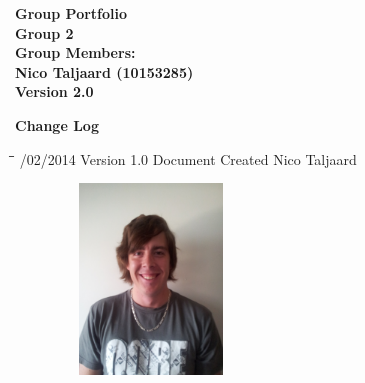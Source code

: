 \documentclass[12pt]{article}
\newcommand{\Title}{Group Portfolio} %
\begin{document}
	\begin{center}%
	
	  \LARGE \bf \Title \\[4em]
	  \LARGE {\bf Group 2}\\[1em]
	  \LARGE {\bf Group Members:}\\[2em]
	  \large
	      Nico Taljaard					(10153285) \\[9em]
	      {\bf Version 2.0}	    
	\end{center}%
	
	\newpage
	{\LARGE \bf Change Log}\\[2em]	
		\begin{tabbing}
			\hspace*{3cm}\=\hspace*{3cm}\=\hspace*{8cm}\=\hspace*{3cm} /02/2014 \> Version 1.0 \> Document Created 		\> Nico Taljaard\\
		\end{tabbing}

	\newpage
	\begin{figure}[ht!]
		\centering
		\includegraphics[width=2in, height=2in]{./Pictures/NicoTaljaard.jpg}
	\end{figure}
	
\end{document}
